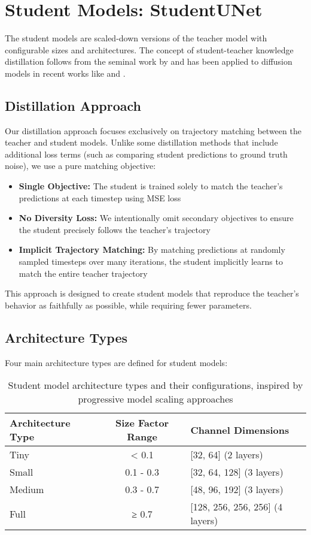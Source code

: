 \documentclass{article}
\begin{document}
\section{Student Models: StudentUNet}

The student models are scaled-down versions of the teacher model with configurable sizes and architectures. The concept of student-teacher knowledge distillation follows from the seminal work by \citet{hinton2015distilling} and has been applied to diffusion models in recent works like \citet{salimans2022progressive} and \citet{luhman2021knowledge}.

\subsection{Distillation Approach}

Our distillation approach focuses exclusively on trajectory matching between the teacher and student models. Unlike some distillation methods that include additional loss terms (such as comparing student predictions to ground truth noise), we use a pure matching objective:

\begin{itemize}
  \item \textbf{Single Objective:} The student is trained solely to match the teacher's predictions at each timestep using MSE loss
  \item \textbf{No Diversity Loss:} We intentionally omit secondary objectives to ensure the student precisely follows the teacher's trajectory
  \item \textbf{Implicit Trajectory Matching:} By matching predictions at randomly sampled timesteps over many iterations, the student implicitly learns to match the entire teacher trajectory
\end{itemize}

This approach is designed to create student models that reproduce the teacher's behavior as faithfully as possible, while requiring fewer parameters.

\subsection{Architecture Types}

Four main architecture types are defined for student models:

\begin{table}[h]
\centering
\begin{tabular}{lcl}
\toprule
\textbf{Architecture Type} & \textbf{Size Factor Range} & \textbf{Channel Dimensions} \\
\midrule
Tiny & < 0.1 & [32, 64] (2 layers) \\
Small & 0.1 - 0.3 & [32, 64, 128] (3 layers) \\
Medium & 0.3 - 0.7 & [48, 96, 192] (3 layers) \\
Full & ≥ 0.7 & [128, 256, 256, 256] (4 layers) \\
\bottomrule
\end{tabular}
\caption{Student model architecture types and their configurations, inspired by progressive model scaling approaches \citep{tan2019efficientnet, salimans2022progressive}}
\end{table}
\end{document}
